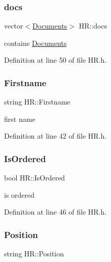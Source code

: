 \subsubsection{\texorpdfstring{docs}{docs}}
{\footnotesize\ttfamily vector$<$\hyperlink{class_documents}{Documents}$>$ H\+R\+::docs\hspace{0.3cm}{\ttfamily [private]}}



contains \hyperlink{class_documents}{Documents} 



Definition at line 50 of file H\+R.\+h.

\mbox{\label{class_h_r_a9d6a324bfb9253c23e71eefeb8bacde2}} 
\subsubsection{\texorpdfstring{Firstname}{Firstname}}
{\footnotesize\ttfamily string H\+R\+::\+Firstname\hspace{0.3cm}{\ttfamily [private]}}



first name 



Definition at line 42 of file H\+R.\+h.

\mbox{\label{class_h_r_a9afdecc986cdc4e15a8d73b30286dbdc}} 
\subsubsection{\texorpdfstring{Is\+Ordered}{IsOrdered}}
{\footnotesize\ttfamily bool H\+R\+::\+Is\+Ordered\hspace{0.3cm}{\ttfamily [private]}}



is ordered 



Definition at line 46 of file H\+R.\+h.

\mbox{\label{class_h_r_aa19b0e239c73c6f5ab18801f102f1c2e}} 
\subsubsection{\texorpdfstring{Position}{Position}}
{\footnotesize\ttfamily string H\+R\+::\+Position\hspace{0.3cm}{\ttfamily [private]}}



